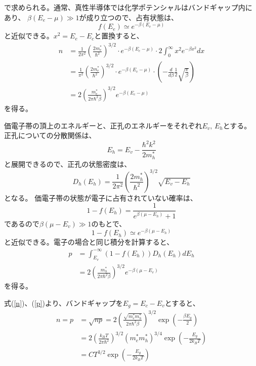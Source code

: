 \documentclass[11pt, titlepage, openany]{ltjsbook}
\begin{document}
で求められる。通常、真性半導体では化学ポテンシャルはバンドギャップ内にあり、
$\beta (E_e - \mu) \gg 1$が成り立つので、占有状態は、
\begin{equation}
  f(E_e) \simeq e^{-\beta(E_e - \mu)}
\end{equation}
と近似できる。$x^2 = E_e - E_c$と置換すると、
\begin{align}
  n & = \frac{1}{2\pi^2} \left( \frac{2m_e^*}{\hbar^2} \right)^{3/2} \cdot e^{-\beta(E_c - \mu)} \cdot 2 \int_{0}^{\infty} x^2 e^{-\beta x^2} dx \\
  & = \frac{1}{\pi^2} \left( \frac{2m_e^*}{\hbar^2} \right)^{3/2} \cdot e^{-\beta(E_c - \mu)} \cdot \left( - \frac{d}{d\beta} \frac{1}{2} \sqrt{ \frac{\pi}{\beta}} \right) \\
  & = 2 \left( \frac{m_e^*}{2\pi \hbar^2 \beta} \right)^{3/2} e^{-\beta(E_c - \mu)}
  \label{n}
\end{align}
を得る。\par
価電子帯の頂上のエネルギーと、正孔のエネルギーをそれぞれ$E_v,\, E_h$とする。
正孔についての分散関係は、
\begin{equation}
  E_h = E_v - \frac{\hbar^2 k^2}{2 m_h^*}
\end{equation}
と展開できるので、正孔の状態密度は、
\begin{equation}
  D_h(E_h) = \frac{1}{2\pi^2} \left( \frac{2m_h^*}{\hbar^2} \right)^{3/2} \sqrt{E_v - E_h}
\end{equation}
となる。
価電子帯の状態が電子に占有されていない確率は、
\begin{equation}
  1 - f(E_h) = \frac{1}{e^{\beta(\mu - E_h)} + 1}
\end{equation}
であるので$\beta(\mu - E_v) \gg 1$のもとで、
\begin{equation}
  1 - f(E_h) \simeq e^{-\beta(\mu - E_h)}
\end{equation}
と近似できる。電子の場合と同じ積分を計算すると、
\begin{align}
  p & = \int_{E_v}^{-\infty} (1 - f(E_h)) D_h(E_h) dE_h \\
  & = 2 \left( \frac{m_h^*}{2\pi \hbar^2 \beta} \right)^{3/2} e^{-\beta(\mu - E_v)}
  \label{p}
\end{align}
を得る。\par
式(\ref{n})、(\ref{p})より、バンドギャップを$E_g = E_c - E_v$とすると、
\begin{align}
  n = p & = \sqrt{np} = 2 \left( \frac{\sqrt{m_e^* m_h^*}}{2\pi\hbar^2\beta} \right)^{3/2} \exp \left( -\frac{\beta E_g}{2} \right) \\
  & = 2 \left( \frac{k_B T}{2\pi\hbar^2} \right)^{3/2} \left( m_e^* m_h^* \right)^{3/4} \exp \left( - \frac{E_g}{2k_B T}\right) \\
  & = CT^{3/2} \exp \left( - \frac{E_g}{2k_B T}\right)
\end{align}
\end{document}
